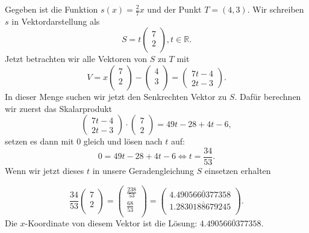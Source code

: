 \documentclass{article}
\begin{document}
Gegeben ist die Funktion \(s(x)=\frac27x\) und der Punkt \(T=(4, 3)\).
Wir schreiben \(s\) in Vektordarstellung als \[S=t\begin{pmatrix}7\\2\\\end{pmatrix}, t\in \mathbb{R}.\]
Jetzt betrachten wir alle Vektoren von \(S\) zu \(T\) mit
\[V=x\begin{pmatrix}7\\2\\\end{pmatrix} - \begin{pmatrix}4\\3\\\end{pmatrix}=
\begin{pmatrix}7t-4\\2t-3\end{pmatrix}.\] In dieser Menge suchen wir jetzt den Senkrechten Vektor
zu \(S\). Dafür berechnen wir zuerst das Skalarprodukt
\[\begin{pmatrix}7t-4\\2t-3\end{pmatrix}\cdot\begin{pmatrix}7\\2\end{pmatrix}=49t-28+4t-6,\] setzen 
es dann mit \(0\) gleich und lösen nach \(t\) auf:
\[0=49t-28+4t-6\Leftrightarrow t=\frac{34}{53}.\]
Wenn wir jetzt dieses \(t\) in unsere Geradengleichung \(S\) einsetzen erhalten

\[\frac{34}{53}\begin{pmatrix}7\\2\\\end{pmatrix}=
\begin{pmatrix}\frac{238}{53}\\\frac{68}{53}\\\end{pmatrix}=
\begin{pmatrix}4.\overline{4905660377358}\\1.\overline{2830188679245}\\\end{pmatrix}
.\]
Die \(x\)-Koordinate von diesem Vektor ist die Lösung: \(4.\overline{4905660377358}\).\\
\end{document}

